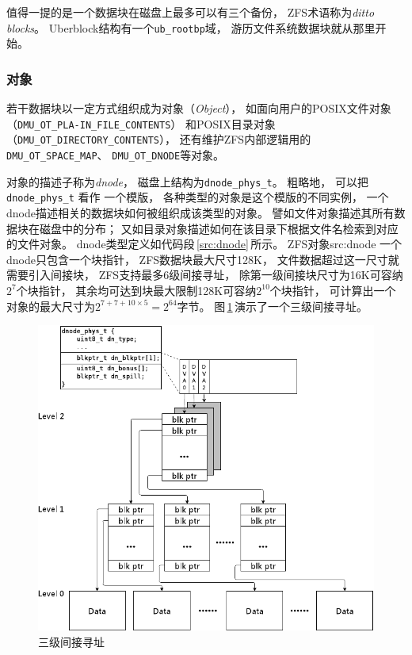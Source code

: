 值得一提的是一个数据块在磁盘上最多可以有三个备份，
ZFS术语称为{\em ditto blocks}。
Uberblock结构有一个\verb|ub_rootbp|域，
游历文件系统数据块就从那里开始。

\subsubsection{对象}
若干数据块以一定方式组织成为对象（{\em Object}），
如面向用户的POSIX文件对象（\verb|DMU_OT_PLA-IN_FILE_CONTENTS|）%
和POSIX目录对象（\verb|DMU_OT_DIRECTORY_CONTENTS|），
还有维护ZFS内部逻辑用的\verb|DMU_OT_SPACE_MAP|、
\verb|DMU_OT_DNODE|等对象。

对象的描述子称为{\em dnode}，
磁盘上结构为\verb|dnode_phys_t|。
粗略地，
可以把 \verb|dnode_phys_t| 看作 一个模版，
各种类型的对象是这个模版的不同实例，
一个dnode描述相关的数据块如何被组织成该类型的对象。
譬如文件对象描述其所有数据块在磁盘中的分布；
又如目录对象描述如何在该目录下根据文件名检索到对应的文件对象。
dnode类型定义如代码段\,\ref{src:dnode}\,所示。
              {ZFS对象}{src:dnode}
一个dnode只包含一个块指针，
ZFS数据块最大尺寸128K，
文件数据超过这一尺寸就需要引入间接块，
ZFS支持最多6级间接寻址，
除第一级间接块尺寸为16K可容纳$2^7$个块指针，
其余均可达到块最大限制128K可容纳$2^{10}$个块指针，
可计算出一个对象的最大尺寸为$2^{7 + 7 + 10 \times 5} = 2^{64}$字节。
图\,\ref{fig:dn_ind}\,演示了一个三级间接寻址。
\begin{figure}[!ht]
  \centering
  \includegraphics[width=.8\textwidth]{fig/zfs_ind_blkptr.pdf}
  \caption{三级间接寻址}\label{fig:dn_ind}
\end{figure}
              
